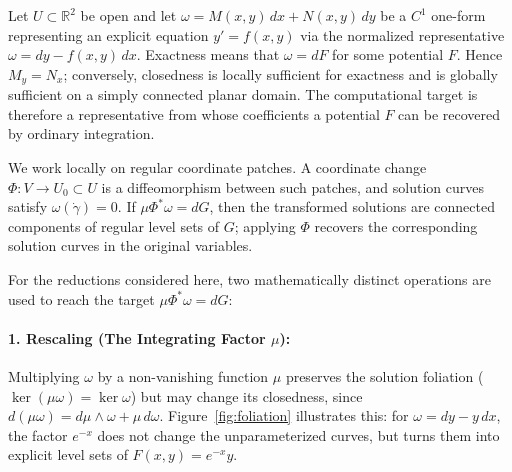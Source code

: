 \documentclass[11pt]{article}
\theoremstyle{definition}
\newcommand{\R}{\mathbb{R}}
\begin{document}
Let \(U\subset\R^2\) be open and let \(\omega=M(x,y)\,dx+N(x,y)\,dy\) be a \(C^1\) one-form representing an explicit equation \(y'=f(x,y)\) via the normalized representative \(\omega=dy-f(x,y)\,dx\). Exactness means that \(\omega=dF\) for some potential \(F\). Hence \(M_y=N_x\); conversely, closedness is locally sufficient for exactness and is globally sufficient on a simply connected planar domain. The computational target is therefore a representative from whose coefficients a potential \(F\) can be recovered by ordinary integration.

We work locally on regular coordinate patches. A coordinate change \(\Phi:V\to U_0\subset U\) is a diffeomorphism between such patches, and solution curves satisfy \(\omega(\dot\gamma)=0\). If \(\mu\Phi^*\omega=dG\), then the transformed solutions are connected components of regular level sets of \(G\); applying \(\Phi\) recovers the corresponding solution curves in the original variables.

For the reductions considered here, two mathematically distinct operations are used to reach the target \(\mu\Phi^*\omega=dG\):

\paragraph{1. Rescaling (The Integrating Factor \(\mu\)):} 
Multiplying \(\omega\) by a non-vanishing function \(\mu\) preserves the solution foliation (\(\ker(\mu\omega)=\ker\omega\)) but may change its closedness, since \(d(\mu\omega) = d\mu \wedge \omega + \mu\,d\omega\). Figure~\ref{fig:foliation} illustrates this: for \(\omega=dy-y\,dx\), the factor \(e^{-x}\) does not change the unparameterized curves, but turns them into explicit level sets of \(F(x,y) = e^{-x}y\).
\end{document}
